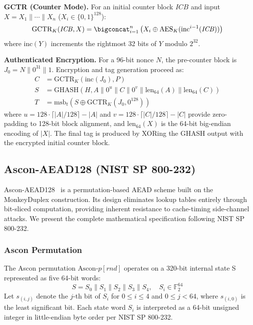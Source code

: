 \documentclass[11pt,a4paper]{article}
\newcommand{\F}{\mathbb{F}}
\newcommand{\xor}{\oplus}
\newcommand{\concat}{\mathbin{\|}}
\newcommand{\GHASH}{\text{GHASH}}
\newcommand{\GCTR}{\text{GCTR}}
\newcommand{\AES}{\text{AES}}
\newcommand{\msb}{\text{msb}}
\begin{document}
\textbf{GCTR (Counter Mode).} For an initial counter block $\mathit{ICB}$ and input $X = X_1 \concat \cdots \concat X_n$ ($X_i \in \{0,1\}^{128}$):
\begin{equation}
\GCTR_K(\mathit{ICB}, X) = \bigconcat_{i=1}^{n} \left( X_i \xor \AES_K(\text{inc}^{i-1}(\mathit{ICB})) \right)
\end{equation}
where $\text{inc}(Y)$ increments the rightmost 32 bits of $Y$ modulo $2^{32}$.

\textbf{Authenticated Encryption.} For a 96-bit nonce $N$, the pre-counter block is $J_0 = N \concat 0^{31} \concat 1$. Encryption and tag generation proceed as:
\begin{align}
C &= \GCTR_K(\text{inc}(J_0), P) \\
S &= \GHASH(H, A \concat 0^u \concat C \concat 0^v \concat \text{len}_{64}(A) \concat \text{len}_{64}(C)) \\
T &= \msb_t\left(S \xor \GCTR_K(J_0, 0^{128})\right)
\end{align}
where $u = 128 \cdot \lceil |A|/128 \rceil - |A|$ and $v = 128 \cdot \lceil |C|/128 \rceil - |C|$ provide zero-padding to 128-bit block alignment, and $\text{len}_{64}(X)$ is the 64-bit big-endian encoding of $|X|$. The final tag is produced by XORing the GHASH output with the encrypted initial counter block.

\subsection{Ascon-AEAD128 (NIST SP 800-232)}

Ascon-AEAD128~\cite{nist_sp800_232,ascon_spec} is a permutation-based AEAD scheme built on the MonkeyDuplex construction. Its design eliminates lookup tables entirely through bit-sliced computation, providing inherent resistance to cache-timing side-channel attacks. We present the complete mathematical specification following NIST SP 800-232.

\subsubsection{Ascon Permutation}

The Ascon permutation $\text{Ascon-}p[rnd]$ operates on a 320-bit internal state S represented as five 64-bit words:
\begin{equation}
S = S_0 \concat S_1 \concat S_2 \concat S_3 \concat S_4, \quad S_i \in \F_2^{64}
\label{eq:ascon_state}
\end{equation}
Let $s_{(i,j)}$ denote the $j$-th bit of $S_i$ for $0 \leq i \leq 4$ and $0 \leq j < 64$, where $s_{(i,0)}$ is the least significant bit. Each state word $S_i$ is interpreted as a 64-bit unsigned integer in little-endian byte order per NIST SP 800-232.
\end{document}
